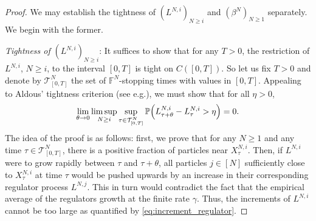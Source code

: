 \documentclass[11pt, a4paper]{article}
\theoremstyle{plain}
\theoremstyle{definition}
\theoremstyle{remark}
\numberwithin{equation}{section}
\newcommand{\pr}{\mathbb{P}}
\newcommand{\bb}[1]{\mathbb{#1}}
\renewcommand{\cal}[1]{\mathcal{#1}}
\begin{document}
\begin{proof}
We may establish the tightness of $(L^{N, i})_{N \geq i}$ and $(\beta^N)_{N \geq 1}$ separately. We begin with the former.

\textit{Tightness of} $(L^{N, i})_{N \geq i}$: It suffices to show that for any $T > 0$, the restriction of $L^{N, i}$, $N \geq i$, to the interval $[0, T]$ is tight on $C([0, T])$. So let us fix $T > 0$ and denote by $\cal{T}^N_{[0, T]}$ the set of $\bb{F}^N$-stopping times with values in $[0, T]$. Appealing to Aldous' tightness criterion (see e.g.\@ \cite[Theorem 16.10]{billingsley_convergence_1999}), we must show that for all $\eta > 0$,
\begin{equation} \label{eq:increment_regulator}
    \lim_{\theta \to 0} \limsup_{N \geq i} \sup_{\tau \in \cal{T}^N_{[0, T]}} \pr\Bigl(L^{N, i}_{\tau + \theta} - L^{N, i}_{\tau} > \eta\Bigr) = 0.
\end{equation}
The idea of the proof is as follows: first, we prove that for any $N \geq 1$ and any time $\tau \in \cal{T}^N_{[0, T]}$, there is a positive fraction of particles near $X^{N, i}_{\tau}$. Then, if $L^{N, i}$ were to grow rapidly between $\tau$ and $\tau + \theta$, all particles $j \in [N]$ sufficiently close to $X^{N, i}_{\tau}$ at time $\tau$ would be pushed upwards by an increase in their corresponding regulator process $L^{N, j}$. This in turn would contradict the fact that the empirical average of the regulators growth at the finite rate $\gamma$. Thus, the increments of $L^{N, i}$ cannot be too large as quantified by \eqref{eq:increment_regulator}.


\end{proof}
\end{document}
